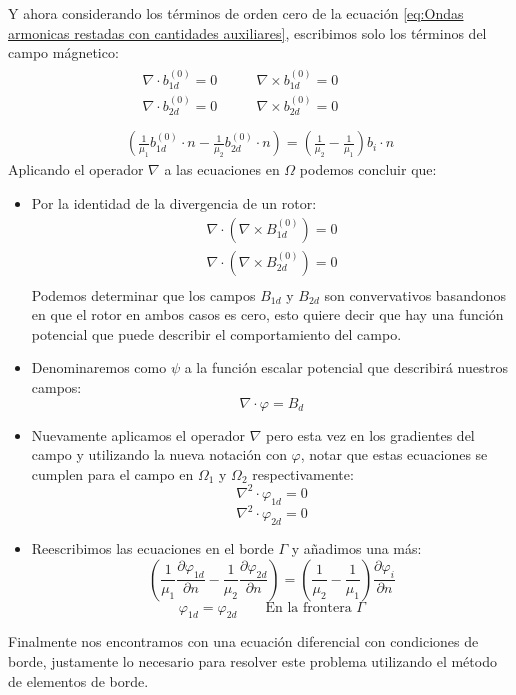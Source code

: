 Y ahora considerando los términos de orden cero de la ecuación \eqref{eq:Ondas armonicas restadas con cantidades auxiliares}, escribimos solo los términos del campo mágnetico:
\begin{equation}
\label{eq:Sistema Campo Magnetico}
\begin{gathered}
\begin{aligned}
&\nabla\cdot b_{1d}^{(0)}= 0\qquad & \nabla\times b_{1d}^{(0)}= 0\\
&\nabla\cdot b_{2d}^{(0)} = 0\qquad &  \nabla\times b_{2d}^{(0)}= 0\\
\end{aligned}\\
\left(\frac{1}{\mu_1}b_{1d}^{(0)}\cdot n-\frac{1}{\mu_2}b_{2d}^{(0)}\cdot n\right)=\left(\frac{1}{\mu_2}-\frac{1}{\mu_1}\right)b_i\cdot n
\end{gathered}
\end{equation}
Aplicando el operador $\nabla$ a las ecuaciones en $\Omega$ podemos concluir que:
\begin{itemize}
\item Por la identidad de la divergencia de un rotor:
\begin{equation*}
\begin{split}
\nabla \cdot (\nabla \times B_{1d}^{(0)})=0\\
\nabla \cdot (\nabla \times B_{2d}^{(0)})=0\\
\end{split}
\end{equation*}
Podemos determinar 	que los campos $B_{1d}$ y $B_{2d}$ son convervativos basandonos en que el rotor en ambos casos es cero, esto quiere decir que hay una función potencial que puede describir el comportamiento del campo.
\item Denominaremos como $\psi$ a la función escalar potencial que describirá nuestros campos:
$$\nabla \cdot \varphi = B_{d}$$
\item Nuevamente aplicamos el operador $\nabla$ pero esta vez en los gradientes del campo y utilizando la nueva notación con $\varphi$, notar que estas ecuaciones se cumplen para el campo en $\Omega_1$ y $\Omega_2$ respectivamente:
$$\nabla^2\cdot \varphi_{1d}=0$$
$$\nabla^2\cdot \varphi_{2d}=0$$
\item Reescribimos las ecuaciones en el borde $\Gamma$ y añadimos una más:
$$\left(\frac{1}{\mu_1}\frac{\partial \varphi_{1d}}{\partial n}-\frac{1}{\mu_2}\frac{\partial \varphi_{2d}}{\partial n}\right)=\left(\frac{1}{\mu_2}-\frac{1}{\mu_1}\right)\frac{\partial \varphi_{i}}{\partial n}$$
$$\varphi_{1d}=\varphi_{2d}\qquad\text{En la frontera }\Gamma$$
\end{itemize}
Finalmente nos encontramos con una ecuación diferencial con condiciones de borde, justamente lo necesario para resolver este problema utilizando el método de elementos de borde.

